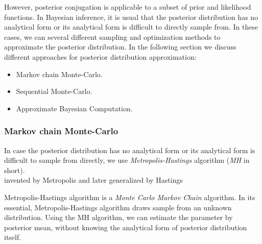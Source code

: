 However, posterior conjugation is applicable to a subset of prior and likelihood functions. In
Bayesian inference, it is usual that the posterior distribution has no analytical form or its
analytical form is difficult to directly sample from. In these cases, we can several different
sampling and optimization methods to approximate the posterior distribution. In the following
section we discuss different approaches for posterior distribution approximation:
\begin{itemize}
    \item Markov chain Monte-Carlo.
    \item Sequential Monte-Carlo.
    \item Approximate Bayesian Computation.
\end{itemize}

\subsubsection{Markov chain Monte-Carlo}
In case the posterior distribution has no analytical form or its analytical form is difficult to
sample from directly, we use \textit{Metropolis-Hastings} algorithm  (\textit{MH} in short).\\
invented by Metropolis \cite{metropolis1953equation} and later generalized by Hastings \cite{hastings1970monte}


Metropolis-Hastings algorithm is a \textit{Monte Carlo Markov Chain} algorithm. In its essential,
Metropolis-Hastings algorithm draws sample from an unknown distribution. Using the MH algorithm, we
can estimate the parameter by posterior mean, without knowing the analytical form of posterior
distribution itself.

